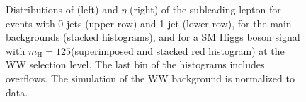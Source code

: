 \begin{figure}
{}
\caption{Distributions of \pt (left) and $\eta$ (right) of the subleading lepton for events with 0 jets (upper row) and 1 jet (lower row), for the main backgrounds (stacked histograms), and for a SM Higgs boson signal with $m_\mathrm{H}=125$\GeV (superimposed and stacked red histogram) at the WW selection level. The last bin of the histograms includes overflows. The simulation of the WW background is normalized to data.}\label{fig:distr2}
\end{figure}

\begin{figure}
\centering
{}
\\
\end{figure}
